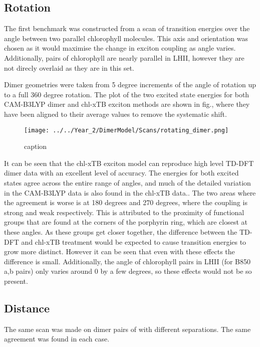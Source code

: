 \subsection{Rotation}
\label{subsec:rotation}

The first benchmark was constructed from a scan of transition energies over the
angle between two parallel chlorophyll molecules. This axis and orientation was
chosen as it would maximise the change in exciton coupling as angle varies. Additionally,
pairs of chlorophyll are nearly parallel in LHII, however they are not direcly overlaid
as they are in this set.

Dimer geometries were taken from 5 degree increments of the angle of rotation up 
to a full 360 degree rotation. The plot of the two excited state energies for both
CAM-B3LYP dimer and chl-xTB exciton methods are shown in fig., where they have been
aligned to their average values to remove the systematic shift.


\begin{figure}
    \texttt{[image: ../../Year\_2/DimerModel/Scans/rotating\_dimer.png]}
    \caption{caption}
\end{figure}

It can be seen that the chl-xTB exciton model can reproduce high level TD-DFT dimer
data with an excellent level of accuracy. The energies for both excited states agree
across the entire range of angles, and much of the detailed variation in the CAM-B3LYP
data is also found in the chl-xTB data.. The two areas where the agreement is worse
is at 180 degrees and 270 degrees, where the coupling is strong and weak respectively.
This is attributed to the proximity of functional groups that are found at the
corners of the porphyrin ring, which are closest at these angles. As these groups
get closer together, the difference between the TD-DFT and chl-xTB treatment would
be expected to cause transition energies to grow more distinct. However it can be
seen that even with these effects the difference is small. Additionally, the angle
of chlorophyll pairs in LHII (for B850 a,b pairs) only varies around 0 by a few 
degrees, so these effects would not be so present.

\subsection{Distance}

The same scan was made on dimer pairs of with different separations. The same 
agreement was found in each case.

